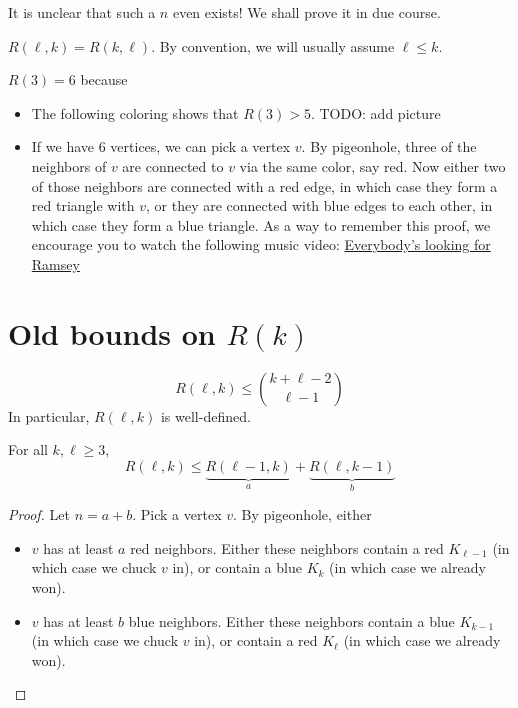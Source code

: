 \documentclass{article}
\begin{document}
It is unclear that such a $n$ even exists! We shall prove it in due course.

$R(\ell, k) = R(k, \ell)$. By convention, we will usually assume $\ell \le k$.

\begin{eg}
  $R(3) = 6$ because
  \begin{itemize}
    \item The following coloring shows that $R(3) > 5$. TODO: add picture
    \item If we have $6$ vertices, we can pick a vertex $v$. By pigeonhole, three of the neighbors of $v$ are connected to $v$ via the same color, say red. Now either two of those neighbors are connected with a red edge, in which case they form a red triangle with $v$, or they are connected with blue edges to each other, in which case they form a blue triangle. As a way to remember this proof, we encourage you to watch the following music video: \href{https://youtu.be/vE7MW2lk55E}{Everybody's looking for Ramsey}
  \end{itemize}
\end{eg}

\section{Old bounds on \texorpdfstring{$R(k)$}{R(k)}}

\begin{thm}
  $$R(\ell, k) \le \binom{k + \ell - 2}{\ell - 1}$$
  In particular, $R(\ell, k)$ is well-defined.
\end{thm}

\begin{lemma}
  For all $k, \ell \ge 3$,
  $$R(\ell, k) \le \underbrace{R(\ell - 1, k)}_a + \underbrace{R(\ell, k - 1)}_b$$
\end{lemma}
\begin{proof}
  Let $n = a + b$. Pick a vertex $v$. By pigeonhole, either
  \begin{itemize}
    \item $v$ has at least $a$ red neighbors. Either these neighbors contain a red $K_{\ell - 1}$ (in which case we chuck $v$ in), or contain a blue $K_k$ (in which case we already won).
    \item $v$ has at least $b$ blue neighbors. Either these neighbors contain a blue $K_{k - 1}$ (in which case we chuck $v$ in), or contain a red $K_\ell$ (in which case we already won).
  \end{itemize}
\end{proof}
\end{document}

